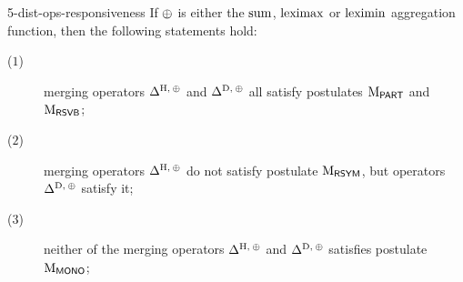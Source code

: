 \begin{prp}{}{5-dist-ops-responsiveness}
	If ${\operatorname{\oplus}}$ is either the ${\operatorname{sum}}$, ${\operatorname{leximax}}$ or ${\operatorname{leximin}}$ aggregation function,
	then the following statements hold:
	\begin{description}
		\item [($1$)] merging operators $\Delta^{{\operatorname{H}},\:{\operatorname{\oplus}}}$	and $\Delta^{{\operatorname{D}},\:{\operatorname{\oplus}}}$
			all satisfy postulates $\mathrm{M}_{\mathsf{PART}}$ and $\mathrm{M}_{\mathsf{RSVB}}$;
		\item[($2$)] merging operators $\Delta^{{\operatorname{H}},\:{\operatorname{\oplus}}}$ do not satisfy postulate $\mathrm{M}_{\mathsf{RSYM}}$,
			but operators $\Delta^{{\operatorname{D}},\:{\operatorname{\oplus}}}$ satisfy it;
		\item[($3$)] neither of the merging operators $\Delta^{{\operatorname{H}},\:{\operatorname{\oplus}}}$ and $\Delta^{{\operatorname{D}},\:{\operatorname{\oplus}}}$
			satisfies postulate $\mathrm{M}_{\mathsf{MONO}}$;
	\end{description}
\end{prp}
